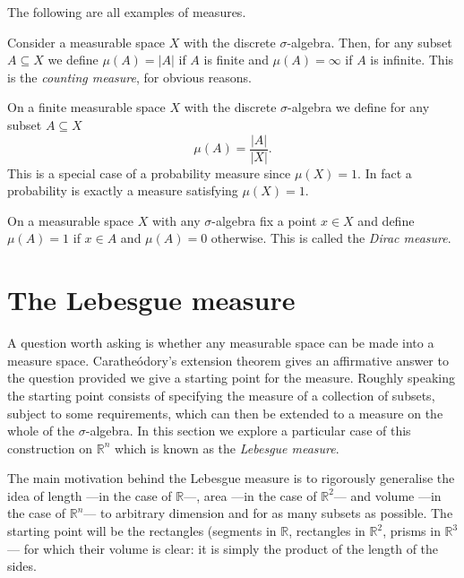 \documentclass[12pt,oneside]{book}
\numberwithin{table}{section}
\numberwithin{equation}{section}
\numberwithin{figure}{section}
\newcommand{\R}{\mathbb{R}}
\newcommand{\abs}[1]{\lvert #1 \rvert}
\begin{document}
\begin{example}
	The following are all examples of measures.
	\begin{points}
	\item Consider a measurable space \( X \) with the discrete \( \sigma \)-algebra. Then, for any subset \( A \subseteq X \) we define \( \mu(A) = \abs{A} \) if \( A \) is finite and \( \mu(A) = \infty \) if \( A \) is infinite. This is the \emph{counting measure}, for obvious reasons.
	\item On a finite measurable space \( X \) with the discrete \( \sigma \)-algebra we define for any subset \( A \subseteq X \)
		\begin{equation*}
			\mu(A) = \frac{\abs{A}}{\abs{X}}.
		\end{equation*}
		This is a special case of a probability measure since \( \mu(X) = 1 \). In fact a probability is exactly a measure satisfying \( \mu(X) = 1 \).
	\item On a measurable space \( X \) with any \( \sigma \)-algebra fix a point \( x \in X \) and define \( \mu(A) = 1 \) if \( x \in A \) and \( \mu(A) = 0 \) otherwise. This is called the \emph{Dirac measure}.
	\end{points}
\end{example}

\section{The Lebesgue measure}
A question worth asking is whether any measurable space can be made into a measure space. Caratheódory's extension theorem gives an affirmative answer to the question provided we give a starting point for the measure. Roughly speaking the starting point consists of specifying the measure of a collection of subsets, subject to some requirements, which can then be extended to a measure on the whole of the \( \sigma \)-algebra. In this section we explore a particular case of this construction on \( \R^n \) which is known as the \emph{Lebesgue measure}.

The main motivation behind the Lebesgue measure is to rigorously generalise the idea of length ---in the case of \( \R \)---, area ---in the case of \( \R^2 \)--- and volume ---in the case of \( \R^n \)--- to arbitrary dimension and for as many subsets as possible. The starting point will be the rectangles (segments in \( \R \), rectangles in \( \R^2 \), prisms in \( \R^3 \)--- for which their volume is clear: it is simply the product of the length of the sides. 
\end{document}
